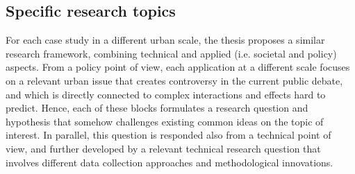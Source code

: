 \subsection{Specific research topics}
For each case study in a different urban scale, the thesis proposes a similar research framework, combining technical and applied (i.e. societal and policy) aspects. From a policy point of view, each application at a different scale focuses on a relevant urban issue that creates controversy in the current public debate, and which is directly connected to complex interactions and effects hard to predict. Hence, each of these blocks formulates a research question and hypothesis that somehow challenges existing common ideas on the topic of interest. In parallel, this question is responded also from a technical point of view, and further developed by a relevant technical research question that involves different data collection approaches and methodological innovations.

